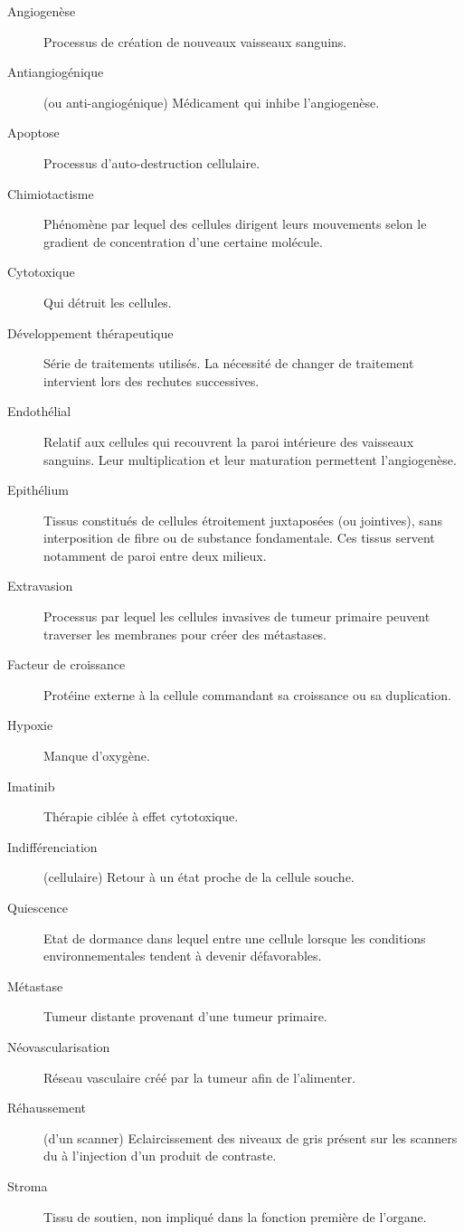 \documentclass[main.tex]{subfiles}
\begin{document}

\begin{description}
\item[Angiogenèse] Processus de création de nouveaux vaisseaux sanguins. 
\item[Antiangiogénique] (ou anti-angiogénique) Médicament qui inhibe l'angiogenèse.
\item[Apoptose] Processus d'auto-destruction cellulaire.
\item[Chimiotactisme] Phénomène par lequel des cellules dirigent leurs mouvements selon le gradient de concentration d'une certaine molécule.
\item[Cytotoxique] Qui détruit les cellules.
\item[Développement thérapeutique] Série de traitements utilisés. La nécessité de changer de traitement intervient lors des rechutes successives. 
\item[Endothélial] Relatif aux cellules qui recouvrent la paroi intérieure des vaisseaux sanguins. Leur multiplication et leur maturation permettent l'angiogenèse.
\item[Epithélium] Tissus constitués de cellules étroitement juxtaposées (ou jointives), sans interposition de fibre ou de substance fondamentale. Ces tissus servent notamment de paroi entre deux milieux. 
\item[Extravasion] Processus par lequel les cellules invasives de tumeur primaire peuvent traverser les membranes pour créer des métastases. 
\item[Facteur de croissance] Protéine externe à la cellule commandant sa croissance ou sa duplication.
\item[Hypoxie] Manque d'oxygène.
\item[Imatinib] Thérapie ciblée à effet cytotoxique. 
\item[Indifférenciation] (cellulaire) Retour à un état proche de la cellule souche. 
\item[Quiescence] Etat de dormance dans lequel entre une cellule lorsque les conditions environnementales tendent à devenir défavorables.
\item[Métastase] Tumeur distante provenant d'une tumeur primaire.
\item[Néovascularisation] Réseau vasculaire créé par la tumeur afin de l'alimenter.
\item[Réhaussement] (d'un scanner) Eclaircissement des niveaux de gris présent sur les scanners du à l'injection d'un produit de contraste. 
\item[Stroma] Tissu de soutien, non impliqué dans la fonction première de l'organe.

\end{description}
\end{document}

